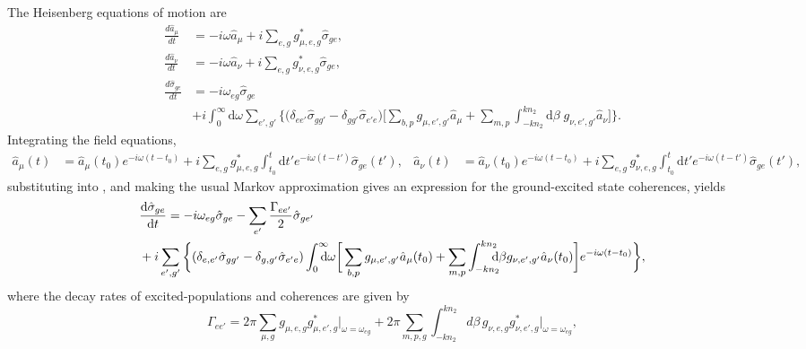 \documentclass[preprint, aps,pra,onecolumn]{revtex4-1} %
\newcommand{\der}[1]{\frac{d {#1}}{dt}}
\begin{document}
The Heisenberg equations of motion are
\begin{subequations}
	\begin{align}
		\der{\hat{a}_\mu} &= -i\omega \hat{a}_\mu +i\sum_{e,g} g_{\mu, e,g}^* \hat{\sigma}_{ge} \label{eq:da},\\
		\der{\hat{a}_\nu} &= -i\omega \hat{a}_\nu +i\sum_{e,g} g_{\nu, e,g}^*  \hat{\sigma}_{ge}\label{eq:danu},\\
		\der{\hat{\sigma}_{ge}} &= -i\omega_{eg} \hat{\sigma}_{ge} \label{Eq::dsigma}  \\
			&+ i\!\int_0^{\infty}\!\!\!\!\! \mathrm{d}\omega \sum_{e',g'} \bigg\{ \big(\delta_{ee'} \hat{\sigma}_{gg'} \!-\! \delta_{gg'} \hat{\sigma}_{e'e} \big) \bigg[ \sum_{b,p}  g_{\mu, e',g'}\hat{a}_\mu \!+\! \sum_{m,p} \!\int_{-kn_2}^{kn_2}\!\!\!\!\!\! \mathrm{d}\beta \; g_{\nu, e',g'} \hat{a}_\nu \bigg] \bigg\}. \nonumber
	\end{align}
\end{subequations}
Integrating the field equations, 
\begin{subequations}\label{eq:aout1}
\begin{align}
\hat{a}_\mu(t) &= \hat{a}_\mu(t_0) e^{-i\omega (t-t_0)} +i \sum_{e,g} g_{\mu,e,g}^* \int_{t_0}^t 
\mathrm{d} t' e^{-i\omega (t-t')}\hat{\sigma}_{ge}(t'), \label{Eq::aguidedEOM}
\end{align}
\begin{align}
\hat{a}_\nu (t) &= \hat{a}_\nu (t_0) e^{-i\omega (t-t_0)} +i \sum_{e,g} g_{\nu,e,g}^* \int_{t_0}^t \mathrm{d} 
t' e^{-i\omega (t-t')}\hat{\sigma}_{ge}(t'),
\end{align}
\end{subequations}
substituting into , and making the usual Markov approximation gives an expression for the ground-excited state coherences, yields
\begin{align}
&\dt{\hat{\sigma}_{ge}} =-i\omega_{eg} 
\hat{\sigma}_{ge}-\sum_{e'}\frac{\Gamma_{ee'}}{2}\hat{\sigma}_{ge'}  \\
&+i \sum_{e',g'}\bigg\{ (\delta_{e,e'} \hat{\sigma}_{gg'} - \delta_{g,g'} 
\hat{\sigma}_{e'e})\int_0^{\infty}\!\!\!\!\!\mathrm{d}\omega \bigg[ \sum_{b,p}  g_{\mu, e',g'} \hat{a}_\mu (t_0) 
+\sum_{m,p}  \int_{-kn_2}^{kn_2}\!\!\!\!\!\mathrm{d}\beta  g_{\nu, e',g'} \hat{a}_\nu(t_0) \bigg] e^{-i\omega 
(t-t_0)}\bigg\}, \nonumber
\end{align}
where the decay rates of excited-populations and coherences are given by 
	\begin{equation}
		\Gamma_{ee'} = 2\pi \sum_{\mu,g} g_{\mu,e,g}g^*_{\mu,e',g} \vert_{\omega=\omega_{eg}}+2\pi 
\sum_{m,p,g} \int_{-kn_2}^{kn_2}\!\!\!\!\! d\beta \, g_{\nu,e,g}g^*_{\nu,e',g} \vert_{\omega=\omega_{eg}}, \label{Eq::TotaleeDecayRate}
	\end{equation}
\end{document}
